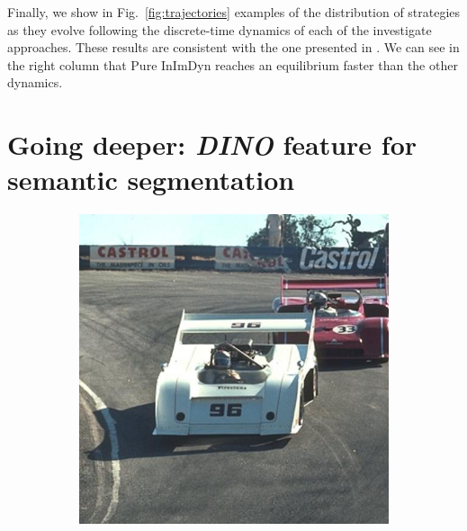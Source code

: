 \documentclass[11pt,a4paper]{article}
\begin{document}
Finally, we show in Fig.~\ref{fig:trajectories} examples of the distribution of strategies as they evolve following the discrete-time dynamics of each of the investigate approaches. These results are consistent with the one presented in \cite{game-clustering}. We can see in the right column that Pure InImDyn reaches an equilibrium faster than the other dynamics.

\section{Going deeper: \textit{DINO} feature for semantic segmentation}
\label{sec:dino}

\begin{figure}
    \centering
    \begin{subfigure}[b]{0.3\textwidth}
        \centering
        \includegraphics[width=\textwidth]{figures/dino/tile_1/21077.jpg}

\end{subfigure}
\end{figure}
\end{document}
